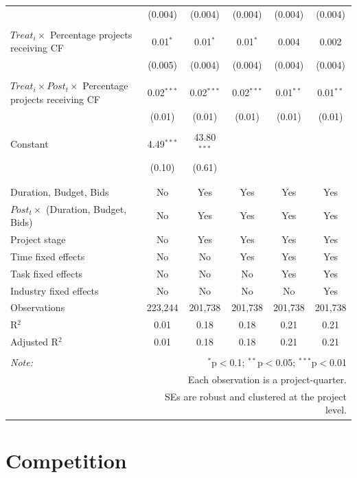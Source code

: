 \documentclass[
]{article}
\begin{document}
\begin{table}[H]
\begin{tabular}{@{\extracolsep{-2pt}}lccccc}
  & (0.004) & (0.004) & (0.004) & (0.004) & (0.004) \\ 
  & & & & & \\ 
 $Treat_i \times$ Percentage projects receiving CF & 0.01$^{*}$ & 0.01$^{*}$ & 0.01$^{*}$ & 0.004 & 0.002 \\ 
  & (0.005) & (0.004) & (0.004) & (0.004) & (0.004) \\ 
  & & & & & \\ 
 $Treat_i \times Post_t \times$ Percentage projects receiving CF & 0.02$^{***}$ & 0.02$^{***}$ & 0.02$^{***}$ & 0.01$^{**}$ & 0.01$^{**}$ \\ 
  & (0.01) & (0.01) & (0.01) & (0.01) & (0.01) \\ 
  & & & & & \\ 
 Constant & 4.49$^{***}$ & 43.80$^{***}$ &  &  &  \\ 
  & (0.10) & (0.61) &  &  &  \\ 
  & & & & & \\ 
\hline \\[-1.8ex] 
Duration, Budget, Bids & No & Yes & Yes & Yes & Yes \\ 
$Post_t \times $  (Duration, Budget, Bids) & No & Yes & Yes & Yes & Yes \\ 
Project stage & No & Yes & Yes & Yes & Yes \\ 
Time fixed effects & No & No & Yes & Yes & Yes \\ 
Task fixed effects & No & No & No & Yes & Yes \\ 
Industry fixed effects & No & No & No & No & Yes \\ 
Observations & 223,244 & 201,738 & 201,738 & 201,738 & 201,738 \\ 
R$^{2}$ & 0.01 & 0.18 & 0.18 & 0.21 & 0.21 \\ 
Adjusted R$^{2}$ & 0.01 & 0.18 & 0.18 & 0.21 & 0.21 \\ 
\hline 
\hline \\[-1.8ex] 
\textit{Note:}  & \multicolumn{5}{r}{$^{*}$p$<$0.1; $^{**}$p$<$0.05; $^{***}$p$<$0.01} \\ 
 & \multicolumn{5}{r}{Each observation is a project-quarter.} \\ 
 & \multicolumn{5}{r}{SEs are robust and clustered at the project level.} \\ 
\end{tabular} 
\end{table}

\hypertarget{competition}{%
\section{Competition}\label{competition}}
\end{document}
